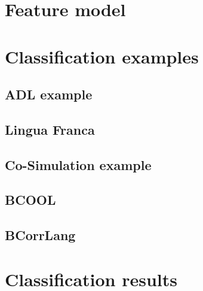 \documentclass[runningheads]{llncs}
\begin{document}
\cite{gomesCoSimulationSurvey2019}



\section{Feature model} \label{sec:features}

\section{Classification examples} \label{sec:classifications}

\subsection{ADL example} %
\subsection{Lingua Franca} %
\subsection{Co-Simulation example} %
\subsection{BCOOL} %
\subsection{BCorrLang} %

\section{Classification results}
\end{document}
